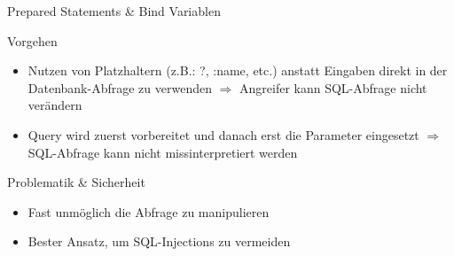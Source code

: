 \begin{frame}{Prepared Statements \& Bind Variablen}
\begin{block}{Vorgehen}
\begin{itemize}
	\item Nutzen von Platzhaltern (z.B.: ?, :name, etc.) anstatt Eingaben direkt in der Datenbank-Abfrage zu verwenden $\Rightarrow$ Angreifer kann SQL-Abfrage nicht verändern

	\item Query wird zuerst vorbereitet und danach erst die Parameter eingesetzt $\Rightarrow$ SQL-Abfrage kann nicht missinterpretiert werden
\end{itemize}
\end{block}
\begin{block}{Problematik \& Sicherheit}
\begin{itemize}[<+->]
	\item Fast unmöglich die Abfrage zu manipulieren
	\item Bester Ansatz, um SQL-Injections zu vermeiden
\end{itemize}
\end{block}
\end{frame}

